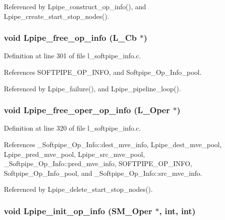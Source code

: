 Referenced by Lpipe\_\-construct\_\-op\_\-info(), and Lpipe\_\-create\_\-start\_\-stop\_\-nodes().
\subsubsection{\setlength{\rightskip}{0pt plus 5cm}void Lpipe\_\-free\_\-op\_\-info (L\_\-Cb $\ast$)}\label{l__softpipe__info_8h_45c673e7167fafd1100dac8ab302e403}




Definition at line 301 of file l\_\-softpipe\_\-info.c.

References SOFTPIPE\_\-OP\_\-INFO, and Softpipe\_\-Op\_\-Info\_\-pool.

Referenced by Lpipe\_\-failure(), and Lpipe\_\-pipeline\_\-loop().
\subsubsection{\setlength{\rightskip}{0pt plus 5cm}void Lpipe\_\-free\_\-oper\_\-op\_\-info (L\_\-Oper $\ast$)}\label{l__softpipe__info_8h_c089fa4aaed7b8b8fbc55c6bc2b7aaf4}




Definition at line 320 of file l\_\-softpipe\_\-info.c.

References \_\-Softpipe\_\-Op\_\-Info::dest\_\-mve\_\-info, Lpipe\_\-dest\_\-mve\_\-pool, Lpipe\_\-pred\_\-mve\_\-pool, Lpipe\_\-src\_\-mve\_\-pool, \_\-Softpipe\_\-Op\_\-Info::pred\_\-mve\_\-info, SOFTPIPE\_\-OP\_\-INFO, Softpipe\_\-Op\_\-Info\_\-pool, and \_\-Softpipe\_\-Op\_\-Info::src\_\-mve\_\-info.

Referenced by Lpipe\_\-delete\_\-start\_\-stop\_\-nodes().
\subsubsection{\setlength{\rightskip}{0pt plus 5cm}void Lpipe\_\-init\_\-op\_\-info (\bf{SM\_\-Oper} $\ast$, int, int)}\label{l__softpipe__info_8h_8e2902c259eea437f212d8dd2f37581d}





